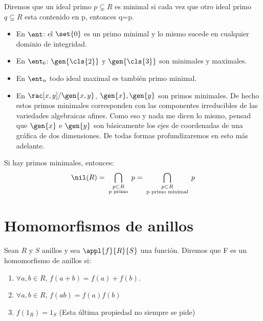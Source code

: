 \begin{defn}
	Diremos que un ideal primo $p \subsetneq R$ es minimal si cada vez que otro ideal primo $q \subsetneq R$ esta contenido en p, entonces q=p.
\end{defn}

\begin{example}
	\begin{itemize}
		\item En $\ent$: el $\set{0}$ es un primo minimal y lo mismo sucede en cualquier dominio de integridad.
		\item En $\ent_6$: $\gen{\cls{2}}$ y $\gen{\cls{3}}$ son minimales y maximales.
		\item En $\ent_n$ todo ideal maximal es también primo minimal.
		\item En $\rac[x,y]/\gen{x,y}$, $\gen{x},\gen{y}$ son primos minimales. De hecho estos primos minimales corresponden con las componentes irreducibles de las variedades  algebraicas afines. Como eso y nada me dicen lo mismo, pensad que $\gen{x}$ e $\gen{y}$ son básicamente los ejes de coordenadas de una gráfica de dos dimensiones. De todas formas profundizaremos en esto más adelante.
	\end{itemize}
\end{example}

\obs Si hay primos minimales, entonces:
$$ \nil(R)=\bigcap_{\substack{p\subset R \\ \text{ p primo }}} p = \bigcap_{\substack{p\subset R \\ \text{ p primo minimal }}}p $$

\section{Homomorfismos de anillos}

\begin{defn} Sean $R$ y $S$ anillos y sea $\appl{f}{R}{S}$ una función. Diremos que F es un homomorfismo de anillos si:
\begin{enumerate}
	\item $\forall a,b \in R$, $f(a+b)=f(a)+f(b)$.
	\item $\forall a,b \in R$, $f(ab)=f(a)f(b)$
	\item $f(1_R)=1_S$ (Esta última propiedad no siempre se pide)
\end{enumerate}
\end{defn}

